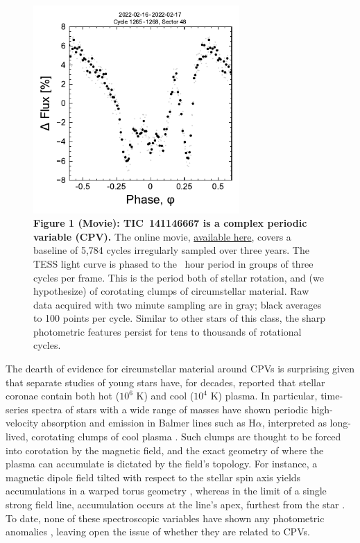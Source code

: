 \documentclass{nature3}
\begin{document}
\begin{figure}[!t]
  \centering
  \includegraphics[width=0.7\textwidth]{figures/f1.pdf}
  \captionsetup{labelformat=empty}
  \caption{{\bf Figure 1 (Movie):  TIC~141146667 is a complex periodic
  variable (CPV).}  The online movie,
  \href{https://lgbouma.com/movies/TIC141146667_20250116.mp4}{available here},
  covers a baseline of 5{,}784 cycles irregularly sampled over three
  years.  The TESS light curve is phased to the \periodhr\ hour period
  in groups of three cycles per frame.  This is the period both of
  stellar rotation, and (we hypothesize) of corotating clumps of
  circumstellar material.  Raw data acquired with two minute sampling
  are in gray; black averages to 100 points per cycle.  Similar to
  other stars of this class, the sharp photometric features persist
  for tens to thousands of rotational cycles. }
  \label{fig:lc}
\end{figure}

The dearth of evidence for circumstellar material around CPVs is
surprising given that separate studies of young stars have, for
decades, reported that stellar coronae contain both hot ($10^6$ K) and
cool ($10^4$ K) plasma. In particular, time-series spectra of stars
with a wide range of masses have shown periodic high-velocity
absorption and emission in Balmer lines such as H$\alpha$, interpreted
as long-lived, corotating clumps of cool plasma
\cite{CollierCameron1989,CollierCameron1992,Barnes2000,Donati2000,Dunstone2006,Skelly2008,Leitzinger2016,Cang2021}.
Such clumps are thought to be forced into corotation by the magnetic
field, and the exact geometry of where the plasma can accumulate is
dictated by the field's topology.  For instance, a magnetic dipole field
tilted with respect to the stellar spin axis
yields accumulations in a warped torus geometry
\cite{Townsend2005}, whereas in the limit of a single strong field
line, accumulation occurs at the line's apex, furthest from the star
\cite{Waugh2022}.  To date, none of these spectroscopic variables have
shown any photometric anomalies \cite{Bouma2024}, leaving open the
issue of whether they are related to CPVs.
\end{document}

